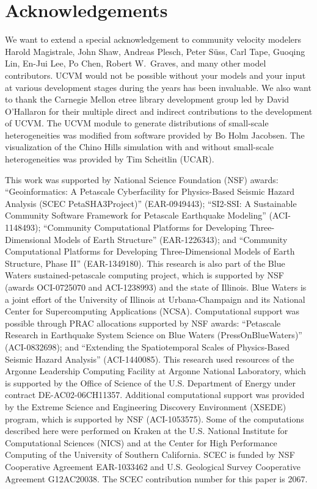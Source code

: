 
\section{Acknowledgements}

We want to extend a special acknowledgement to community velocity modelers Harold Magistrale, John Shaw, Andreas Plesch, Peter S\"{u}ss, Carl Tape, Guoqing Lin, En-Jui Lee, Po Chen, Robert W.~Graves, and many other model contributors. UCVM would not be possible without your models and your input at various development stages during the years has been invaluable. We also want to thank the Carnegie Mellon etree library development group led by David O'Hallaron for their multiple direct and indirect contributions to the development of UCVM. The UCVM module to generate distributions of small-scale heterogeneities was modified from software provided by Bo Holm Jacobsen. The visualization of the Chino Hills simulation with and without small-scale heterogeneities was provided by Tim Scheitlin (UCAR).

This work was supported by National Science Foundation (NSF) awards: ``Geoinformatics: A Petascale Cyberfacility for Physics-Based Seismic Hazard Analysis (SCEC PetaSHA3Project)'' (EAR-0949443); ``SI2-SSI: A Sustainable Community Software Framework for Petascale Earthquake Modeling'' (ACI-1148493); ``Community Computational Platforms for Developing Three-Dimensional Models of Earth Structure'' (EAR-1226343); and ``Community Computational Platforms for Developing Three-Dimensional Models of Earth Structure, Phase II'' (EAR-1349180).  This research is also part of the Blue Waters sustained-petascale computing project, which is supported by NSF (awards OCI-0725070 and ACI-1238993) and the state of Illinois. Blue Waters is a joint effort of the University of Illinois at Urbana-Champaign and its National Center for Supercomputing Applications (NCSA). Computational support was possible through PRAC allocations supported by NSF awards: ``Petascale Research in Earthquake System Science on Blue Waters (PressOnBlueWaters)'' (ACI-0832698); and ``Extending the Spatiotemporal Scales of Physics-Based Seismic Hazard Analysis'' (ACI-1440085). This research used resources of the Argonne Leadership Computing Facility at Argonne National Laboratory, which is supported by the Office of Science of the U.S. Department of Energy under contract DE-AC02-06CH11357. Additional computational support was provided by the Extreme Science and Engineering Discovery Environment (XSEDE) program, which is supported by NSF (ACI-1053575). Some of the computations described here were performed on Kraken at the U.S. National Institute for Computational Sciences (NICS) and at the Center for High Performance Computing of the University of Southern California. SCEC is funded by NSF Cooperative Agreement EAR-1033462 and U.S. Geological Survey Cooperative Agreement G12AC20038. The SCEC contribution number for this paper is 2067.

